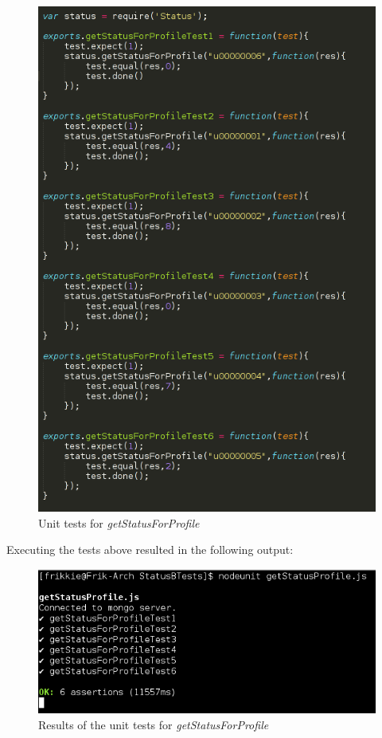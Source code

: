 \documentclass[a4paper,12pt]{article}
\begin{document}
	\begin{figure}[H]
		\centering
		\includegraphics[width=1.0\textwidth]{Figures/getStatusForProfile_unittests.png}
		\caption{Unit tests for \textit{getStatusForProfile}}
	\end{figure}
	
Executing the tests above resulted in the following output:

	\begin{figure}[H]
		\centering
		\includegraphics[width=1.0\textwidth]{Figures/getStatusForProfile_results.png}
		\caption{Results of the unit tests for \textit{getStatusForProfile}}
	\end{figure}
	
\end{document}
